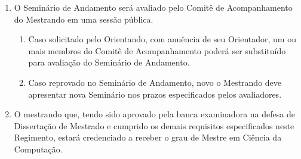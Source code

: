 \documentclass{article}
\begin{document}
\begin{enumerate}
	\item O Seminário de Andamento será avaliado pelo Comitê de Acompanhamento do Mestrando em uma sessão pública.
	\begin{enumerate}
		\item Caso solicitado pelo Orientando, com anuência de seu Orientador, um ou mais membros do Comitê de Acompanhamento poderá ser substituído para avaliação do Seminário de Andamento.
		\item Caso reprovado no Seminário de Andamento, novo o Mestrando deve apresentar nova Seminário nos prazos especificados pelos avaliadores.
	\end{enumerate}

	\item O mestrando que, tendo sido aprovado pela banca examinadora na defesa de Dissertação de Mestrado e cumprido os demais requisitos especificados neste Regimento, estará credenciado a receber o grau de Mestre em Ciência da Computação.

\end{enumerate}
\end{document}
